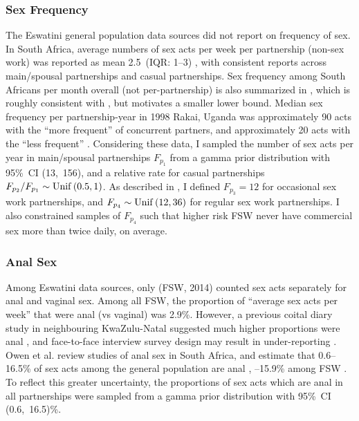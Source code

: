 \subsubsection{Sex Frequency}\label{model.par.sex.freq}
The Eswatini general population data sources \cite{SDHS2006,SHIMS1,SHIMS2}
did not report on frequency of sex. %
In South Africa, average numbers of sex acts per week per partnership (non-sex work)
was reported as mean 2.5~(IQR: 1--3) \cite{Delva2013},
with consistent reports across main/spousal partnerships and casual partnerships.
Sex frequency among South Africans per month overall (not per-partnership)
is also summarized in \cite[Figure~3.15]{Shisana2005},
which is roughly consistent with \cite{Delva2013}, but motivates a smaller lower bound.
Median sex frequency per partnership-year in 1998 Rakai, Uganda was
approximately 90 acts with the ``more frequent'' of concurrent partners, and
approximately 20 acts with the ``less frequent'' \cite{Morris2010}.
Considering these data,
I sampled the number of sex acts per year in main/spousal partnerships
$F_{p_{1}}$ from a gamma prior distribution with 95\%~CI (13,~156),
and a relative rate for casual partnerships $F_{p_{2}}/F_{p_{1}} \sim \operatorname{Unif}\,(0.5,1)$.
As described in ,
I defined $F_{p_{3}} = 12$ for occasional sex work partnerships,
and $F_{p_{4}} \sim \operatorname{Unif}\,(12,36)$ for regular sex work partnerships.
I also constrained samples of $F_{p_{4}}$ such that
higher risk FSW never have commercial sex more than twice daily, on average.
\subsubsection{Anal Sex}\label{model.par.sex.anal}
Among Eswatini data sources, only \cite{EswKP2014} (FSW, 2014)
counted sex acts separately for anal and vaginal sex.
Among all FSW, the proportion of ``average sex acts per week'' that were anal (vs vaginal) was 2.9\%.
However, a previous coital diary study in neighbouring KwaZulu-Natal suggested
much higher proportions were anal \cite{Ramjee1999},
and face-to-face interview survey design may result in under-reporting \cite{Owen2020}.
Owen et al. review studies of anal sex in South Africa, and estimate that
0.6--16.5\% of sex acts among the general population are anal \cite{Owen2017}, --15.9\% among FSW \cite{Owen2020}.
To reflect this greater uncertainty, the proportions of sex acts which are anal
in all partnerships were sampled from a gamma prior distribution with 95\%~CI (0.6,~16.5)\%.
